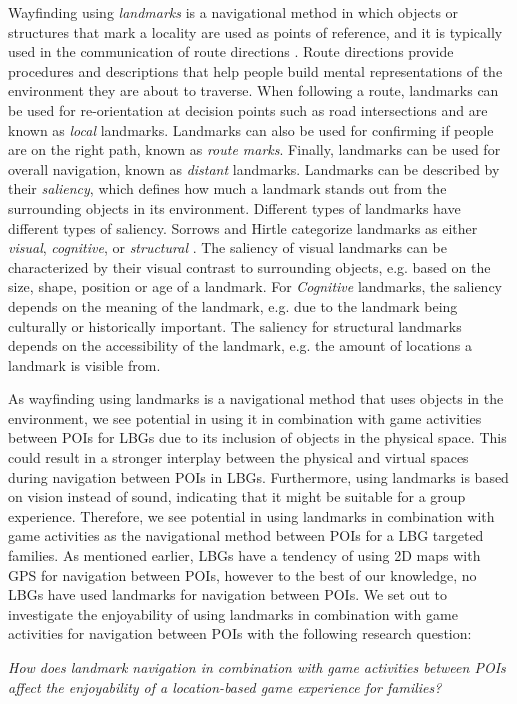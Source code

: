 Wayfinding using \textit{landmarks} is a navigational method in which objects or structures that mark a locality are used as points of reference, and it is typically used in the communication of route directions \cite{landmarks}. Route directions provide procedures and descriptions that help people build mental representations of the environment they are about to traverse. When following a route, landmarks can be used for re-orientation at decision points such as road intersections and are known as \textit{local} landmarks. Landmarks can also be used for confirming if people are on the right path, known as \textit{route marks}. Finally, landmarks can be used for overall navigation, known as \textit{distant} landmarks. Landmarks can be described by their \textit{saliency}, which defines how much a landmark stands out from the surrounding objects in its environment. Different types of landmarks have different types of saliency. Sorrows and Hirtle categorize landmarks as either \textit{visual}, \textit{cognitive}, or \textit{structural} \cite{landmarksChar}. The saliency of visual landmarks can be characterized by their visual contrast to surrounding objects, e.g. based on the size, shape, position or age of a landmark. For \textit{Cognitive} landmarks, the saliency depends on the meaning of the landmark, e.g. due to the landmark being culturally or historically important. The saliency for structural landmarks depends on the accessibility of the landmark, e.g. the amount of locations a landmark is visible from.  

As wayfinding using landmarks is a navigational method that uses objects in the environment, we see potential in using it in combination with game activities between POIs for LBGs due to its inclusion of objects in the physical space. This could result in a stronger interplay between the physical and virtual spaces during navigation between POIs in LBGs. Furthermore, using landmarks is based on vision instead of sound, indicating that it might be suitable for a group experience. Therefore, we see potential in using landmarks in combination with game activities as the navigational method between POIs for a LBG targeted families. As mentioned earlier, LBGs have a tendency of using 2D maps with GPS for navigation between POIs, however to the best of our knowledge, no LBGs have used landmarks for navigation between POIs. We set out to investigate the enjoyability of using landmarks in combination with game activities for navigation between POIs with the following research question:

\emph{How does landmark navigation in combination with game activities between POIs affect the enjoyability of a location-based game experience for families?}


